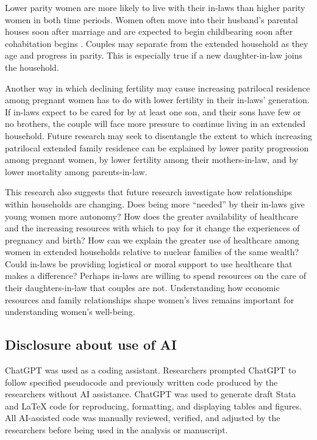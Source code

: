 \documentclass[12pt]{article}
\begin{document}
Lower parity women are more likely to live with their in-laws than higher parity women in both time periods.  Women often move into their husband's parental houses soon after marriage \citep{breton2021modernisation} and are expected to begin childbearing soon after cohabitation begins \citep{ibarra2020desire}. Couples may separate from the extended household as they age and progress in parity. This is especially true if a new daughter-in-law joins the household.  

Another way in which declining fertility may cause increasing patrilocal residence among pregnant women has to do with lower fertility in their in-laws' generation.  If in-laws expect to be cared for by at least one son, and their sons have few or no brothers, the couple will face more pressure to continue living in an extended household.  Future research may seek to disentangle the extent to which increasing patrilocal extended family residence can be explained by lower parity progression among pregnant women, by lower fertility among their mothers-in-law, and by lower mortality among parents-in-law. 

This research also suggests that future research investigate how relationships within households are changing. Does being more ``needed'' by their in-laws give young women more autonomy?  How does the greater availability of healthcare and the increasing resources with which to pay for it change the experiences of pregnancy and birth?  How can we explain the greater use of healthcare among women in extended households relative to nuclear families of the same wealth?  Could in-laws be providing logistical or moral support to use healthcare that makes a difference?  Perhaps in-laws are willing to spend resources on the care of their daughters-in-law that couples are not.  Understanding how economic resources and family relationships shape women's lives remains important for understanding women's well-being. 





\subsection*{Disclosure about use of AI}

ChatGPT was used as a coding assistant. Researchers prompted ChatGPT to follow specified pseudocode and previously written code produced by the researchers without AI assistance. ChatGPT was used to generate draft Stata and LaTeX code for reproducing, formatting, and displaying tables and figures. All AI-assisted code was manually reviewed, verified, and adjusted by the researchers before being used in the analysis or manuscript.
\end{document}
